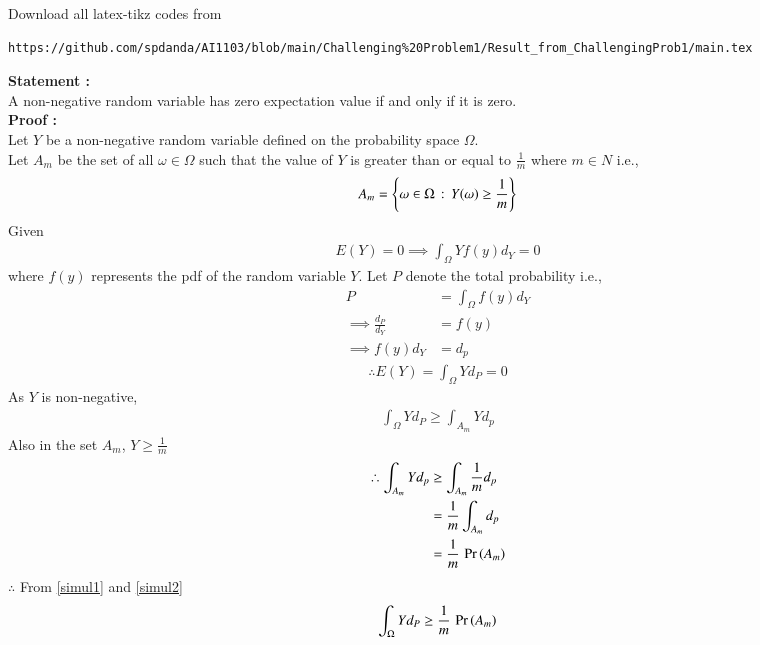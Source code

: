 \documentclass[journal,12pt,twocolumn]{IEEEtran}
\begin{document}
\author{Name: Sai Pravallika Danda, Roll Number: CS20BTECH11013}
\maketitle
\newpage
\bigskip
\renewcommand{\thefigure}{\theenumi}
\renewcommand{\thetable}{\theenumi}
Download all latex-tikz codes from 
%
\begin{lstlisting}
https://github.com/spdanda/AI1103/blob/main/Challenging%20Problem1/Result_from_ChallengingProb1/main.tex
\end{lstlisting}
\large\textbf{Statement :}\\
A non-negative random variable has zero expectation value if and only if it is zero.\\
\textbf{Proof :}\\
Let $Y$ be a non-negative random variable defined on the probability space $\Omega$.\\
Let $A_m$ be the set of all $\omega \in \Omega$ such that the value of $Y$ is greater than or equal to $\frac{1}{m}$ where $m \in N$ i.e.,
$$A_m = \left\{\omega \in \Omega\,:\,Y(\omega) \geq \frac{1}{m}\right\}$$
Given
\begin{align}
    E(Y) =0 \implies \int_\Omega Y f(y)d_Y =0
\end{align}
where $f(y)$ represents the pdf of the random variable $Y$.
Let $P$ denote the total probability i.e.,
\begin{align}
    P &= \int_\Omega f(y)d_Y\\
    \implies \frac{d_P}{d_Y} &= f(y)\\
    \implies   f(y)d_Y &= d_p 
\end{align}
\begin{align}
\therefore E(Y) = \int_\Omega Yd_P = 0
\end{align}
As $Y$ is non-negative,
\begin{align}
    \int_\Omega Yd_P \geq \int_{A_m}Yd_p \label{simul1}
\end{align}
Also in the set $A_m$, $Y \geq \frac{1}{m}$
\begin{align}
  \therefore \int_{A_m}Yd_p  &\geq  \int_{A_m}\frac{1}{m}d_p\\
                             &= \frac{1}{m}\int_{A_m}d_p\\
                             &= \frac{1}{m}\,\Pr\left(A_m\right) \label{simul2}
\end{align}
$\therefore$ From \eqref{simul1} and \eqref{simul2}
\begin{align}
  \int_\Omega Yd_P \geq \frac{1}{m}\,\Pr\left(A_m\right)
\end{align}
\end{document}
